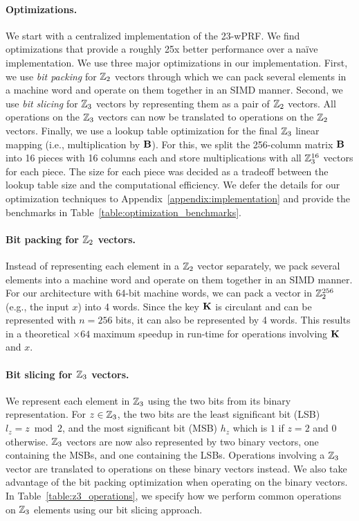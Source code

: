 \paragraph{Optimizations.}
We start with a centralized implementation of the 23-wPRF. We find optimizations that provide a roughly 25x better performance over a na\"ive implementation.
\iffull\else 
We use three major optimizations in our implementation. First, we use \textit{bit packing} for $\mathbb{Z}_2$ vectors through which we can pack several elements in a machine word and operate on them together in an SIMD manner. Second, we use \textit{bit slicing} for $\mathbb{Z}_3$ vectors by representing them as a pair of $\mathbb{Z}_2$ vectors. All operations on the $\mathbb{Z}_3$ vectors can now be translated to operations on the $\mathbb{Z}_2$ vectors. Finally, we use a lookup table optimization for the final $\mathbb{Z}_3$ linear mapping (i.e., multiplication by $\mat{B}$). For this, we split the 256-column matrix $\mat{B}$ into 16 pieces with 16 columns each and store multiplications with all $\mathbb{Z}_3^{16}$ vectors for each piece. The size for each piece was decided as a tradeoff between the lookup table size and the computational efficiency. We defer the details for our optimization techniques to Appendix~\ref{appendix:implementation} and provide the benchmarks in Table~\ref{table:optimization_benchmarks}.\fi
\fi
\iffull
\paragraph{Bit packing for $\mathbb{Z}_2$ vectors.} 
Instead of representing each element in a $\mathbb{Z}_2$ vector separately, we pack several elements into a machine word and operate on them together in an SIMD manner. For our architecture with 64-bit machine words, we can pack a vector in $\mathbb{Z}_2^{256}$ (e.g., the input $x$) into 4 words. Since the key $\mat{K}$ is circulant and can be represented with $n=256$ bits, it can also be represented by 4 words. This results in a theoretical $\times64$ maximum speedup in run-time for operations involving $\mat{K}$ and $x$. 

\paragraph{Bit slicing for $\mathbb{Z}_3$ vectors.}
We represent each element in $\mathbb{Z}_3$ using the two bits from its binary representation. For $z \in \mathbb{Z}_3$, the two bits are the least significant bit (LSB) $l_z = z \bmod 2$, and the most significant bit (MSB) $h_z$ which is $1$ if $z=2$ and $0$ otherwise. $\mathbb{Z}_3$ vectors are now also represented by two binary vectors, one containing the MSBs, and one containing the LSBs. Operations involving a $\mathbb{Z}_3$ vector are translated to operations on these binary vectors instead. We also take advantage of the bit packing optimization when operating on the binary vectors.
In Table~\ref{table:z3_operations}, we specify how we perform common operations on $\mathbb{Z}_3$ elements using our bit slicing approach. 

